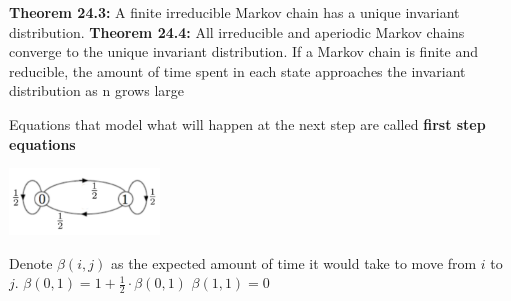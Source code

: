 {\begin{minipage}{16.3cm}
\textbf{Theorem 24.3:} A finite irreducible Markov chain has a unique 
invariant distribution.
\textbf{Theorem 24.4:} All irreducible and aperiodic Markov chains 
converge to the unique invariant distribution. If a Markov chain is 
finite and reducible, the amount of time spent in each state approaches 
the invariant distribution as n grows large

Equations that model what will happen at the next step are called 
\textbf{first step equations}

\vspace{5mm}

\begin{minipage}[b]{0.6\linewidth}
\begin{center}
\includegraphics[width=4cm]{definitions_markov_chain.jpg} 
\end{center}
\end{minipage}%
\hfill
\begin{minipage}[b]{0.4\linewidth}
Denote $\beta(i, j)$ as the expected amount of time it would take to 
move from $i$ to $j$.
$\beta(0, 1) = 1 + \frac{1}{2} \cdot \beta(0, 1)$
$\beta(1, 1) = 0$

\end{minipage}

\end{minipage}}